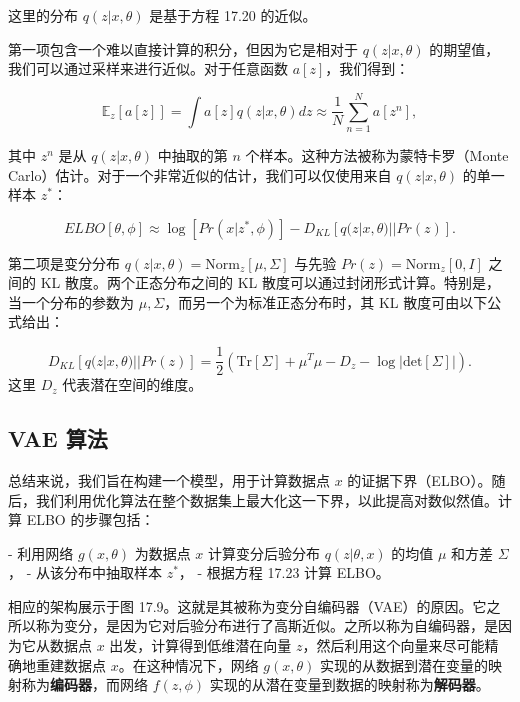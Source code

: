 这里的分布 \(q(z|x, \theta)\) 是基于方程 17.20 的近似。

第一项包含一个难以直接计算的积分，但因为它是相对于 \(q(z|x, \theta)\) 的期望值，我们可以通过采样来进行近似。对于任意函数 \(a[z]\)，我们得到：

\begin{equation}
\mathbb{E}_z [a[z]] = \int a[z] q(z|x, \theta) dz \approx \frac{1}{N} \sum_{n=1}^N a[z^n], 
\end{equation}

其中 \(z^n\) 是从 \(q(z|x, \theta)\) 中抽取的第 \(n\) 个样本。这种方法被称为蒙特卡罗（Monte Carlo）估计。对于一个非常近似的估计，我们可以仅使用来自 \(q(z|x, \theta)\) 的单一样本 \(z^*\)：

\begin{equation}
ELBO[\theta, \phi] \approx \log \left[ Pr(x|z^*, \phi) \right] - D_{KL} \left[ q(z|x, \theta) || Pr(z) \right]. 
\end{equation}

第二项是变分分布 \(q(z|x, \theta) = \text{Norm}_z[\mu, \Sigma]\) 与先验 \(Pr(z) = \text{Norm}_z[0, I]\) 之间的 KL 散度。两个正态分布之间的 KL 散度可以通过封闭形式计算。特别是，当一个分布的参数为 \(\mu, \Sigma\)，而另一个为标准正态分布时，其 KL 散度可由以下公式给出：

\begin{equation}
D_{KL} \left[ q(z|x, \theta) || Pr(z) \right] = \frac{1}{2} \left( \text{Tr}[\Sigma] + \mu^T \mu - D_z - \log \left| \text{det}[\Sigma] \right| \right). 
\end{equation}
这里 \(D_z\) 代表潜在空间的维度。


\subsection{VAE 算法}
总结来说，我们旨在构建一个模型，用于计算数据点 \(x\) 的证据下界（ELBO）。随后，我们利用优化算法在整个数据集上最大化这一下界，以此提高对数似然值。计算 ELBO 的步骤包括：

- 利用网络 \(g(x, \theta)\) 为数据点 \(x\) 计算变分后验分布 \(q(z|\theta, x)\) 的均值 \(\mu\) 和方差 \(\Sigma\)，
- 从该分布中抽取样本 \(z^*\)，
- 根据方程 17.23 计算 ELBO。

相应的架构展示于图 17.9。这就是其被称为变分自编码器（VAE）的原因。它之所以称为变分，是因为它对后验分布进行了高斯近似。之所以称为自编码器，是因为它从数据点 \(x\) 出发，计算得到低维潜在向量 \(z\)，然后利用这个向量来尽可能精确地重建数据点 \(x\)。在这种情况下，网络 \(g(x, \theta)\) 实现的从数据到潜在变量的映射称为\textbf{编码器}，而网络 \(f(z, \phi)\) 实现的从潜在变量到数据的映射称为\textbf{解码器}。

